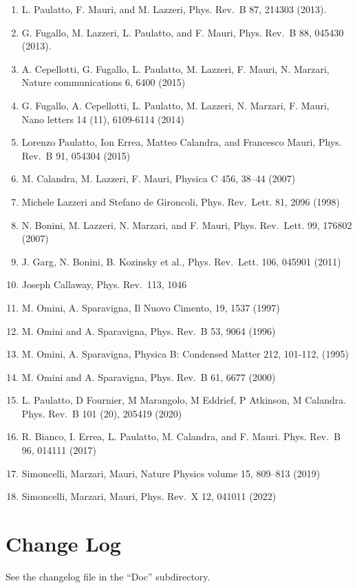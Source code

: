 \documentclass[
]{article}
\providecommand{\tightlist}{%
  \setlength{\itemsep}{0pt}\setlength{\parskip}{0pt}}
\begin{document}
\begin{enumerate}
\def\labelenumi{\arabic{enumi}.}
\tightlist
\item
  L. Paulatto, F. Mauri, and M. Lazzeri, Phys. Rev.~B 87, 214303 (2013).
\item
  G. Fugallo, M. Lazzeri, L. Paulatto, and F. Mauri, Phys. Rev.~B 88,
  045430 (2013).
\item
  A. Cepellotti, G. Fugallo, L. Paulatto, M. Lazzeri, F. Mauri, N.
  Marzari, Nature communications 6, 6400 (2015)
\item
  G. Fugallo, A. Cepellotti, L. Paulatto, M. Lazzeri, N. Marzari, F.
  Mauri, Nano letters 14 (11), 6109-6114 (2014)
\item
  Lorenzo Paulatto, Ion Errea, Matteo Calandra, and Francesco Mauri,
  Phys. Rev.~B 91, 054304 (2015)
\item
  M. Calandra, M. Lazzeri, F. Mauri, Physica C 456, 38--44 (2007)
\item
  Michele Lazzeri and Stefano de Gironcoli, Phys. Rev.~Lett. 81, 2096
  (1998)
\item
  N. Bonini, M. Lazzeri, N. Marzari, and F. Mauri, Phys. Rev.~Lett. 99,
  176802 (2007)
\item
  J. Garg, N. Bonini, B. Kozinsky et al., Phys. Rev.~Lett. 106, 045901
  (2011)
\item
  Joseph Callaway, Phys. Rev.~113, 1046
\item
  M. Omini, A. Sparavigna, Il Nuovo Cimento, 19, 1537 (1997)
\item
  M. Omini and A. Sparavigna, Phys. Rev.~B 53, 9064 (1996)
\item
  M. Omini, A. Sparavigna, Physica B: Condensed Matter 212, 101-112,
  (1995)
\item
  M. Omini and A. Sparavigna, Phys. Rev.~B 61, 6677 (2000)
\item
  L. Paulatto, D Fournier, M Marangolo, M Eddrief, P Atkinson, M
  Calandra. Phys. Rev.~B 101 (20), 205419 (2020)
\item
  R. Bianco, I. Errea, L. Paulatto, M. Calandra, and F. Mauri. Phys.
  Rev.~B 96, 014111 (2017)
\item
  Simoncelli, Marzari, Mauri, Nature Physics volume 15, 809--813 (2019)
\item
  Simoncelli, Marzari, Mauri, Phys. Rev.~X 12, 041011 (2022)
\end{enumerate}

\hypertarget{change-log}{%
\section{Change Log}\label{change-log}}

See the changelog file in the \enquote{Doc} subdirectory.
\end{document}
